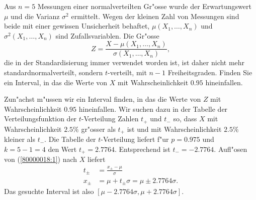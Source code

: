 Aus $n=5$ Messungen einer normalverteilten Gr"osse wurde der Erwartungswert
$\mu$ und die Varianz $\sigma^2$ ermittelt.
Wegen der kleinen Zahl von Messungen sind beide mit einer gewissen
Unsicherheit behaftet, $\mu(X_1,\dots,X_n)$ und  $\sigma^2(X_1,\dots,X_n)$
sind Zufallsvariablen.
Die Gr"osse
\begin{equation}
Z=\frac{X-\mu(X_1,\dots,X_n)}{\sigma(X_1,\dots,X_n)},
\label{80000018:1}
\end{equation}
die in der Standardisierung immer verwendet worden ist, ist daher
nicht mehr standardnormalverteilt, sondern $t$-verteilt, mit $n-1$ 
Freiheitsgraden. Finden Sie ein Interval, in das die Werte von $X$
mit Wahrscheinlichkeit $0.95$ hineinfallen.

\begin{loesung}
Zun"achst m"ussen wir ein Interval finden, in das die Werte von
$Z$ mit Wahrscheinlichkeit $0.95$ hineinfallen. Wir suchen dazu in
der Tabelle der Verteilungsfunktion der $t$-Verteilung Zahlen $t_+$
und $t_-$ so, dass $X$ mit Wahrscheinlichkeit $2.5\%$ gr"osser als $t_+$
ist und mit Wahrscheinlichkeit $2.5\%$ kleiner als $t_-$. Die Tabelle
der $t$-Verteilung liefert f"ur $p=0.975$ und $k=5-1=4$ den Wert
$t_+=2.7764$. Entsprechend ist $t_-=-2.7764$. Aufl"osen von
(\ref{80000018:1}) nach $X$ liefert
\begin{align*}
t_\pm &=\frac{x_{\pm}-\mu}{\sigma}\\
x_\pm&=\mu +t_\pm\sigma = \mu \pm 2.7764\sigma.
\end{align*}
Das gesuchte Interval ist also $[\mu-2.7764\sigma,\mu+2.7764\sigma]$.
\end{loesung}
